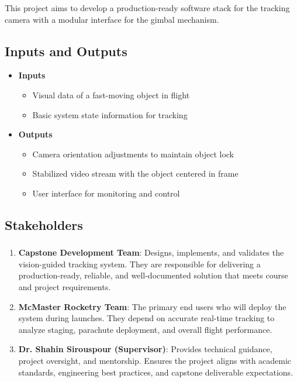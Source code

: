\documentclass{article}
\begin{document}
This project aims to develop a production-ready software stack for the tracking camera with a modular 
interface for the gimbal mechanism.

\subsection{Inputs and Outputs}
\begin{itemize}
    \item \textbf{Inputs}
    \begin{itemize}
        \item Visual data of a fast-moving object in flight
        \item Basic system state information for tracking
    \end{itemize}

    \item \textbf{Outputs}
    \begin{itemize}
        \item Camera orientation adjustments to maintain object lock
        \item Stabilized video stream with the object centered in frame
        \item User interface for monitoring and control
    \end{itemize}
\end{itemize}


\subsection{Stakeholders}

\subsubsection*{\color{blue}{Direct Stakeholders}}
\begin{enumerate}
    \item \textbf{Capstone Development Team}: Designs, implements, and validates the vision-guided tracking system. They are responsible for delivering a production-ready, reliable, and well-documented solution that meets course and project requirements.  

    \item \textbf{McMaster Rocketry Team}: The primary end users who will deploy the system during launches. They depend on accurate real-time tracking to analyze staging, parachute deployment, and overall flight performance.  

    \item \textbf{Dr. Shahin Sirouspour (Supervisor)}: Provides technical guidance, project oversight, and mentorship. Ensures the project aligns with academic standards, engineering best practices, and capstone deliverable expectations.  
\end{enumerate}
\end{document}

